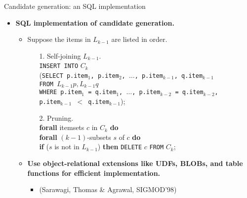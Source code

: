 \documentclass[aspectratio=169,t]{beamer}
\begin{document}
  {
    \begin{frame}{Candidate generation: an SQL implementation}
    \begin{itemize}
      \item \textbf{SQL implementation of candidate generation.}
      \begin{itemize}
        \item Suppose the items in $L_{k-1}$ are listed in order.
        \begin{itemize}
          \item[1.] Self-joining $L_{k-1}$.\\
                \texttt{INSERT INTO} $C_k$\\
                \hspace{1cm} (\texttt{SELECT p.item$_1$, p.item$_2$, $\ldots$, p.item$_{k-1}$, q.item$_{k-1}$}\\
                \hspace{1.1cm} \texttt{FROM $L_{k-1} p, L_{k-1} q$}\\
                \hspace{1.1cm} \texttt{WHERE p.item$_1$ = q.item$_1$, $\ldots$, p.item$_{k-2}$ = q.item$_{k-2}$, \\
                \hspace{2.05cm} p.item$_{k-1}$ $<$ q.item$_{k-1}$});
          \item[2.] Pruning.\\
                \hspace{1cm} \textbf{forall} itemsets $c$ in $C_k$ \textbf{do} \\
                \hspace{2cm} \textbf{forall} $(k-1)$-subsets $s$ of $c$ \textbf{do}\\
                \hspace{3cm} \textbf{if} ($s$ is not in $L_{k-1}$) \textbf{then} \texttt{DELETE} $c$ \texttt{FROM} $C_k$;
        \end{itemize}
        \item \textbf{Use object-relational extensions like UDFs, BLOBs, and table functions for efficient implementation.}
        \begin{itemize}
          \item (Sarawagi, Thomas \& Agrawal, SIGMOD'98)
        \end{itemize}
      \end{itemize}
    \end{itemize}
    \end{frame}
  }
\end{document}
